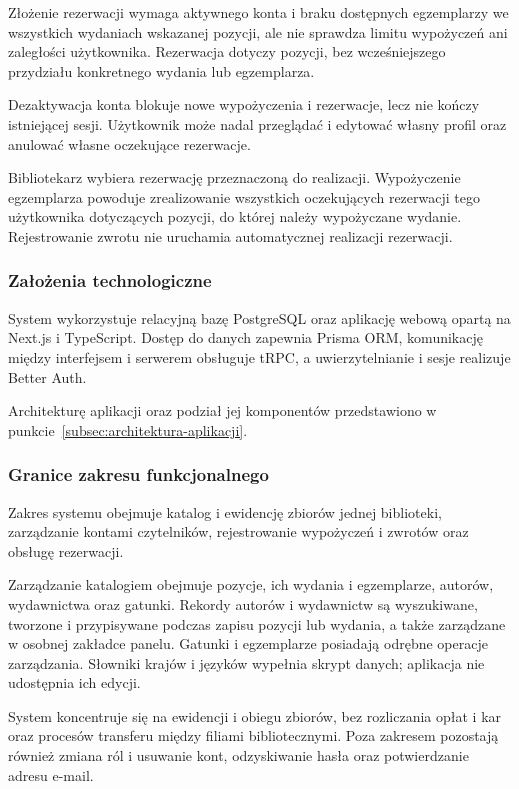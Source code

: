 \documentclass[11pt, a4paper]{article}
\begin{document}
Złożenie rezerwacji wymaga aktywnego konta i braku dostępnych egzemplarzy we wszystkich wydaniach wskazanej pozycji, ale nie sprawdza limitu wypożyczeń ani zaległości użytkownika. Rezerwacja dotyczy pozycji, bez wcześniejszego przydziału konkretnego wydania lub egzemplarza.

Dezaktywacja konta blokuje nowe wypożyczenia i rezerwacje, lecz nie kończy istniejącej sesji. Użytkownik może nadal przeglądać i edytować własny profil oraz anulować własne oczekujące rezerwacje.

Bibliotekarz wybiera rezerwację przeznaczoną do realizacji. Wypożyczenie egzemplarza powoduje zrealizowanie wszystkich oczekujących rezerwacji tego użytkownika dotyczących pozycji, do której należy wypożyczane wydanie. Rejestrowanie zwrotu nie uruchamia automatycznej realizacji rezerwacji.

\subsubsection{Założenia technologiczne}

System wykorzystuje relacyjną bazę PostgreSQL oraz aplikację webową opartą na Next.js i TypeScript. Dostęp do danych zapewnia Prisma ORM, komunikację między interfejsem i serwerem obsługuje tRPC, a uwierzytelnianie i sesje realizuje Better Auth.

Architekturę aplikacji oraz podział jej komponentów przedstawiono w punkcie~\ref{subsec:architektura-aplikacji}.

\subsubsection{Granice zakresu funkcjonalnego}

Zakres systemu obejmuje katalog i ewidencję zbiorów jednej biblioteki, zarządzanie kontami czytelników, rejestrowanie wypożyczeń i zwrotów oraz obsługę rezerwacji.

Zarządzanie katalogiem obejmuje pozycje, ich wydania i egzemplarze, autorów, wydawnictwa oraz gatunki. Rekordy autorów i wydawnictw są wyszukiwane, tworzone i przypisywane podczas zapisu pozycji lub wydania, a także zarządzane w osobnej zakładce panelu. Gatunki i egzemplarze posiadają odrębne operacje zarządzania. Słowniki krajów i języków wypełnia skrypt danych; aplikacja nie udostępnia ich edycji.

System koncentruje się na ewidencji i obiegu zbiorów, bez rozliczania opłat i kar oraz procesów transferu między filiami bibliotecznymi. Poza zakresem pozostają również zmiana ról i usuwanie kont, odzyskiwanie hasła oraz potwierdzanie adresu e-mail.
\end{document}
